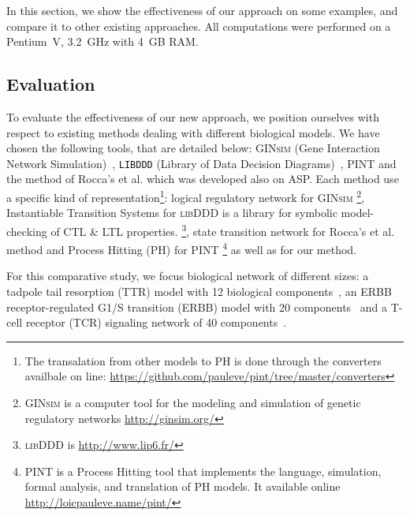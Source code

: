 In this section, we show the effectiveness of our approach on some examples,
and compare it to other existing approaches.
All computations were performed on a Pentium~V, 3.2~GHz with 4~GB RAM.

\subsection{Evaluation}
To evaluate the effectiveness of our new approach,
we position ourselves with respect to existing methods dealing with different biological models.
We have chosen the following tools, that are detailed below: 
\textsc{GINsim} (Gene Interaction Network Simulation)~\cite{gonzalez2006ginsim,naldi2009logical,naldi2007decision},
\texttt{LIBDDD} (Library of Data Decision Diagrams)~\cite{thierry2009hierarchical,colange2013towards},  PINT \cite{PMR12-MSCS} and the method of Rocca's et al. \cite{roccaasp} which was developed also on ASP.
 
Each method use a specific kind of representation\footnote{The transalation from other models to PH is done through the converters availbale on line: \url{https://github.com/pauleve/pint/tree/master/converters}}:
logical regulatory network for \textsc{GINsim} \footnote{\textsc{GINsim} is a computer tool for the modeling and simulation of genetic regulatory networks \url{http://ginsim.org/} },
Instantiable Transition Systems for \textsc{libDDD} is a library for symbolic model-checking of CTL \& LTL properties. \footnote{\textsc{libDDD} is \url{http://www.lip6.fr/} },
state transition network for Rocca's et al. method
and Process Hitting (PH) for \textsc{PINT} \footnote{\textsc{PINT} is a Process Hitting tool that implements the language, simulation, formal analysis, and translation of PH models. It available online \url{http://loicpauleve.name/pint/} } as well as for our method.

For this comparative study, we focus biological network of different sizes:
a tadpole tail resorption (TTR) model with 12 biological components~\cite{khalis2009smbionet},
an ERBB receptor-regulated G1/S transition (ERBB) model with 20 components~\cite{Samaga2009}
and a T-cell receptor (TCR) signaling network of 40 components~\cite{Klamt06}.

